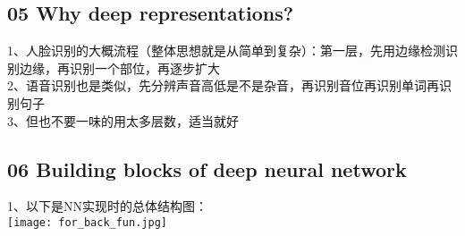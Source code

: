 \documentclass[a4paper,12pt]{article}
\begin{document}
\begin{CJK*}{UTF8}{gbsn}
\begin{flushleft}
\subsection{05 Why deep representations?}
\begin{flushleft}
1、人脸识别的大概流程（整体思想就是从简单到复杂）：第一层，先用边缘检测识别边缘，再识别一个部位，再逐步扩大\\
2、语音识别也是类似，先分辨声音高低是不是杂音，再识别音位再识别单词再识别句子\\
3、但也不要一味的用太多层数，适当就好\\
\end{flushleft}
\subsection{06 Building blocks of deep neural network}
\begin{flushleft}
1、以下是NN实现时的总体结构图：\\
\texttt{[image: for\_back\_fun.jpg]}\\

\end{flushleft}
\end{flushleft}
\end{CJK*}
\end{document}
